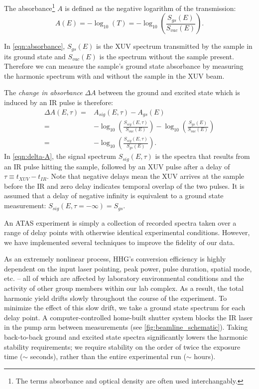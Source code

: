 The absorbance\footnote{The terms absorbance and optical density are often used interchangably.} $A$ is defined as the negative logarithm of the transmission:
\begin{equation}
A(E) = -\log_{10} \left( T \right) = -\log_{10} \left(\frac{S_{gs}(E)}{S_{vac}(E)} \right).
\label{eqn:absorbance}
\end{equation}

In \cref{eqn:absorbance}, $S_{gs}(E)$ is the XUV spectrum transmitted by the sample in its ground state and $S_{vac}(E)$ is the spectrum without the sample present. Therefore we can measure the sample's ground state absorbance by measuring the harmonic spectrum with and without the sample in the XUV beam.

The \textit{change in absorbance} $\Delta A$ between the ground and excited state which is induced by an IR pulse is therefore:
\begin{equation}
\begin{aligned}
\Delta A(E,\tau) = & A_{sig}(E,\tau) - A_{gs}(E) \\
= & -\log_{10} \left(\frac{S_{sig}(E,\tau)}{S_{vac}(E)} \right) -  \log_{10} \left(\frac{S_{gs}(E)}{S_{vac}(E)} \right) \\
= & -\log_{10} \left(\frac{S_{sig}(E,\tau)}{S_{gs}(E)} \right).
\end{aligned}
\label{eqn:delta-A}
\end{equation}
In \cref{eqn:delta-A}, the signal spectrum $S_{sig}(E,\tau)$ is the spectra that results from an IR pulse hitting the sample, followed by an XUV pulse after a delay of $\tau \equiv t_{XUV} - t_{IR}$. Note that negative delays mean the XUV arrives at the sample before the IR and zero delay indicates temporal overlap of the two pulses. It is assumed that a delay of negative infinity is equivalent to a ground state measurement: $S_{sig}(E,\tau=-\infty) = S_{gs}$.

An ATAS experiment is simply a collection of recorded spectra taken over a range of delay points with otherwise identical experimental conditions. However, we have implemented several techniques to improve the fidelity of our data.

As an extremely nonlinear process, HHG's conversion efficiency is highly dependent on the input laser pointing, peak power, pulse duration, spatial mode, etc. -- all of which are affected by laboratory environmental conditions and the activity of other group members within our lab complex. As a result, the total harmonic yield drifts slowly throughout the course of the experiment. To minimize the effect of this slow drift, we take a ground state spectrum for each delay point. A computer-controlled home-built shutter system blocks the IR laser in the pump arm between measurements (see \cref{fig:beamline_schematic}). Taking back-to-back ground and excited state spectra significantly lowers the harmonic stability requirements; we require stability on the order of twice the exposure time ($\sim$ seconds), rather than the entire experimental run ($\sim$ hours).

